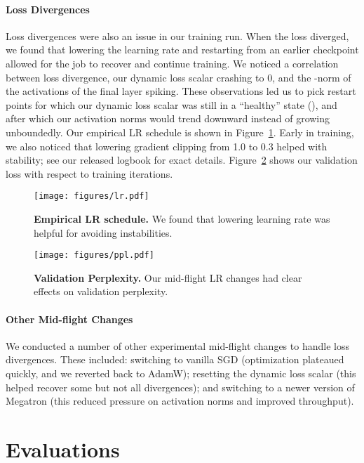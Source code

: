 \documentclass[11pt]{article}
\begin{document}
\paragraph{Loss Divergences}
Loss divergences were also an issue in our training run. When the loss diverged, we found that lowering the learning rate and restarting from an earlier checkpoint allowed for the job to recover and continue training.  We noticed a correlation between loss divergence, our dynamic loss scalar crashing to 0, and the -norm of the activations of the final layer spiking. These observations led us to pick restart points for which our dynamic loss scalar was still in a ``healthy'' state (), and after which our activation norms would trend downward instead of growing unboundedly.  Our empirical LR schedule is shown in Figure~\ref{fig:lr}. Early in training, we also noticed that lowering gradient clipping from 1.0 to 0.3 helped with stability; see our released logbook for exact details.
Figure~\ref{fig:validation_ppl} shows our validation loss with respect to training iterations.

\begin{figure}[t]
    \centering
    \texttt{[image: figures/lr.pdf]}
    \caption{\textbf{Empirical LR schedule.} We found that lowering learning rate was helpful for avoiding instabilities.}
    \label{fig:lr}
\end{figure}

\begin{figure}
    \centering
    \texttt{[image: figures/ppl.pdf]}
    \caption{\textbf{Validation Perplexity.} Our mid-flight LR
    changes had clear effects on validation perplexity.}
    \label{fig:validation_ppl}
\end{figure}

\paragraph{Other Mid-flight Changes} 
We conducted a number of other experimental mid-flight changes to handle loss divergences. These included: switching to vanilla SGD (optimization plateaued quickly, and we reverted back to AdamW); resetting the dynamic loss scalar (this helped recover some but not all divergences); and switching to a newer version of Megatron (this reduced pressure on activation norms and improved throughput).

  \section{Evaluations}
\label{sec:main_results}
\end{document}
